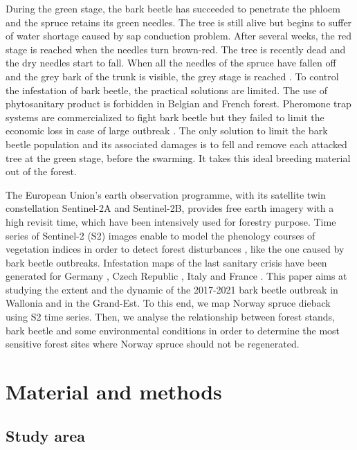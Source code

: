 \documentclass[3p,procedia]{elsarticle}
\begin{document}
During the green stage, the bark beetle has succeeded to penetrate the phloem and the spruce retains its green needles. 
The tree is still alive but begins to suffer of water shortage caused by sap conduction problem. 
After several weeks, the red stage is reached when the needles turn brown-red. The tree is recently dead and the dry needles start to fall.
When all the needles of the spruce have fallen off and the grey bark of the trunk is visible, the grey stage is reached \citep{abdullah_european_2018}. 
To control the infestation of bark beetle, the practical solutions are limited. 
The use of phytosanitary product is forbidden in Belgian and French forest.
Pheromone trap systems are commercialized to fight bark beetle
 but they failed to limit the economic loss in case of large outbreak \citep{kuhn_pheromone_2022}.
The only solution to limit the bark beetle population and its associated damages is to fell and remove each attacked tree at the green stage, before the swarming.
It takes this ideal breeding material out of the forest.

The European Union’s earth observation programme, with its satellite twin constellation Sentinel-2A and Sentinel-2B, provides free earth imagery with a high revisit time, which have been intensively used for forestry purpose. 
Time series of Sentinel-2 (S2) images enable to model the phenology courses of vegetation indices in order to detect forest disturbances \citep{low_phenology_2020}, like the one caused by bark beetle outbreaks.
Infestation maps of the last sanitary crisis have been generated for Germany \citep{ali_canopy_2021,thonfeld_first_2022}, Czech Republic \citep{barta_early_2021}, Italy \citep{dalponte_mapping_2022} and France \citep{nardi_drought_2022}. 
This paper aims at studying the extent and the dynamic of the 2017-2021 bark beetle outbreak in Wallonia and in the Grand-Est.
To this end, we map Norway spruce dieback using S2 time series.
Then, we analyse the relationship between forest stands, bark beetle and some environmental conditions in order to determine the most sensitive forest sites where Norway spruce should not be regenerated.


\section{Material and methods}
\subsection{Study area}
\end{document}
